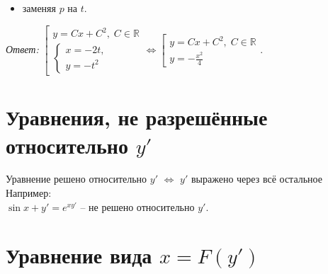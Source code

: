 \documentclass[10pt, a4paper]{article}
\begin{document}
\begin{enumerate}
\begin{itemize}
            \item заменяя $p$ на $t$.
        \end{itemize}
        \par\textit{Ответ:}
            $\left[
              \begin{gathered}
                  y = Cx + C^2,\;C \in \mathbb{R} \\
                  \begin{cases}
                      x = -2t, \\
                      y = -t^2
                  \end{cases}
              \end{gathered}
          \right.
          \Leftrightarrow
          \left[
              \begin{gathered}
                  y = Cx + C^2,\;C \in \mathbb{R} \\
                  y = -\frac{x^2}{4}
              \end{gathered}
          \right.$.
\end{enumerate}


\section*{Уравнения, не разрешённые относительно $y'$}
Уравнение решено относительно $y'$ $\Leftrightarrow$ $y'$ выражено через всё остальное \\
Например: \\
$\sin{x + y'} = e^{xy'}$ -- не решено относительно $y'$.

\section{Уравнение вида $x = F(y')$}
\end{document}
